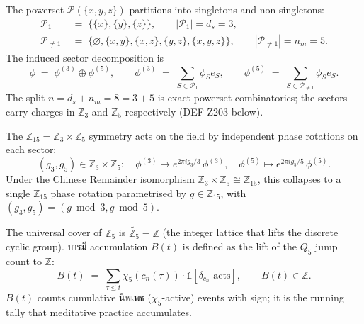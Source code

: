 \documentclass[12pt, a4paper]{article}
\begin{document}
\begin{formalbox}[title={DEF-Z202: Sector Decomposition $\phi^{(3)}\oplus\phi^{(5)}$}]
The powerset $\mathcal{P}(\{x,y,z\})$ partitions into singletons
and non-singletons:
\begin{align}
  \mathcal{P}_1 &\;=\; \{\{x\},\{y\},\{z\}\}, \qquad |\mathcal{P}_1| = d_s = 3,
    \label{eq:Z202-P1} \\
  \mathcal{P}_{\ne 1} &\;=\; \{\varnothing, \{x,y\}, \{x,z\}, \{y,z\}, \{x,y,z\}\},
    \qquad |\mathcal{P}_{\ne 1}| = n_m = 5.
    \label{eq:Z202-Pne1}
\end{align}
The induced sector decomposition is
\begin{equation}
  \phi \;=\; \phi^{(3)} \oplus \phi^{(5)},
  \qquad
  \phi^{(3)} \;=\; \sum_{S \in \mathcal{P}_1} \phi_S e_S,
  \qquad
  \phi^{(5)} \;=\; \sum_{S \in \mathcal{P}_{\ne 1}} \phi_S e_S.
  \label{eq:Z202-decomp}
\end{equation}
The split $n = d_s + n_m = 8 = 3 + 5$ is exact powerset
combinatorics; the sectors carry charges in $\mathbb{Z}_3$ and
$\mathbb{Z}_5$ respectively (DEF-Z203 below).
\end{formalbox}

\begin{formalbox}[title={DEF-Z203: Sector Phase Action ($\mathbb{Z}_{15}$ Symmetry)}]
The $\mathbb{Z}_{15} = \mathbb{Z}_3 \times \mathbb{Z}_5$ symmetry
acts on the field by independent phase rotations on each sector:
\begin{equation}
  (g_3, g_5) \in \mathbb{Z}_3 \times \mathbb{Z}_5:
  \quad
  \phi^{(3)} \mapsto e^{2\pi i g_3 / 3}\, \phi^{(3)},
  \quad
  \phi^{(5)} \mapsto e^{2\pi i g_5 / 5}\, \phi^{(5)}.
  \label{eq:Z203-action}
\end{equation}
Under the Chinese Remainder isomorphism
$\mathbb{Z}_3 \times \mathbb{Z}_5 \cong \mathbb{Z}_{15}$, this
collapses to a single $\mathbb{Z}_{15}$ phase rotation parametrised
by $g \in \mathbb{Z}_{15}$, with $(g_3, g_5) = (g \bmod 3, g \bmod 5)$.
\end{formalbox}

\begin{formalbox}[title={DEF-Z204: Universal Cover for B\=arami Tracking}]
The universal cover of $\mathbb{Z}_5$ is $\widetilde{\mathbb{Z}_5}
= \mathbb{Z}$ (the integer lattice that lifts the discrete cyclic
group). \textthai{บารมี} accumulation $B(t)$ is defined as the lift
of the $Q_5$ jump count to $\mathbb{Z}$:
\begin{equation}
  B(t) \;=\; \sum_{\tau \le t} \chi_5(c_n(\tau)) \cdot \mathbb{1}[\delta_{c_n}\text{ acts}],
  \qquad B(t) \in \mathbb{Z}.
  \label{eq:Z204-Bt}
\end{equation}
$B(t)$ counts cumulative \textthai{นิพเพธ} ($\chi_5$-active) events
with sign; it is the running tally that meditative practice
accumulates.
\end{formalbox}
\end{document}
